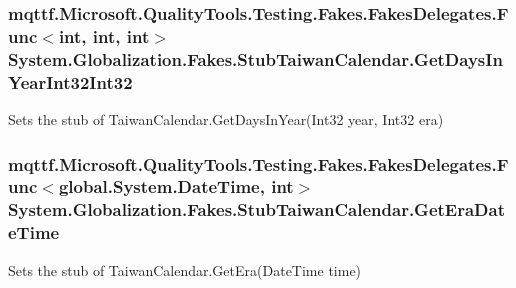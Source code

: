 \hypertarget{class_system_1_1_globalization_1_1_fakes_1_1_stub_taiwan_calendar_a81866b5b3da7eaab3b66d85e1c1dfcf3}{
\subsubsection[{Get\-Days\-In\-Year\-Int32\-Int32}]{\setlength{\rightskip}{0pt plus 5cm}mqttf.\-Microsoft.\-Quality\-Tools.\-Testing.\-Fakes.\-Fakes\-Delegates.\-Func$<$int, int, int$>$ System.\-Globalization.\-Fakes.\-Stub\-Taiwan\-Calendar.\-Get\-Days\-In\-Year\-Int32\-Int32}}\label{class_system_1_1_globalization_1_1_fakes_1_1_stub_taiwan_calendar_a81866b5b3da7eaab3b66d85e1c1dfcf3}


Sets the stub of Taiwan\-Calendar.\-Get\-Days\-In\-Year(\-Int32 year, Int32 era)

\hypertarget{class_system_1_1_globalization_1_1_fakes_1_1_stub_taiwan_calendar_a7da7716e1e2576844fd0d7904f1596cb}{
\subsubsection[{Get\-Era\-Date\-Time}]{\setlength{\rightskip}{0pt plus 5cm}mqttf.\-Microsoft.\-Quality\-Tools.\-Testing.\-Fakes.\-Fakes\-Delegates.\-Func$<$global.\-System.\-Date\-Time, int$>$ System.\-Globalization.\-Fakes.\-Stub\-Taiwan\-Calendar.\-Get\-Era\-Date\-Time}}\label{class_system_1_1_globalization_1_1_fakes_1_1_stub_taiwan_calendar_a7da7716e1e2576844fd0d7904f1596cb}


Sets the stub of Taiwan\-Calendar.\-Get\-Era(\-Date\-Time time)

